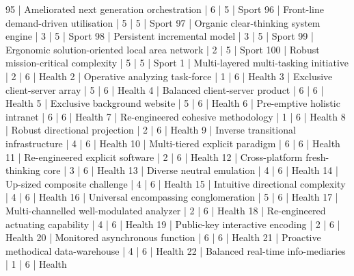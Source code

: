 \begin{enumerate}
\begin{pseudo*}
      95 | Ameliorated next generation orchestration        |        6 |      5 | Sport
      96 | Front-line demand-driven utilisation             |        5 |      5 | Sport
      97 | Organic clear-thinking system engine             |        3 |      5 | Sport
      98 | Persistent incremental model                     |        3 |      5 | Sport
      99 | Ergonomic solution-oriented local area network   |        2 |      5 | Sport
     100 | Robust mission-critical complexity               |        5 |      5 | Sport
       1 | Multi-layered multi-tasking initiative           |        2 |      6 | Health        
       2 | Operative analyzing task-force                   |        1 |      6 | Health        
       3 | Exclusive client-server array                    |        5 |      6 | Health        
       4 | Balanced client-server product                   |        6 |      6 | Health        
       5 | Exclusive background website                     |        5 |      6 | Health        
       6 | Pre-emptive holistic intranet                    |        6 |      6 | Health        
       7 | Re-engineered cohesive methodology               |        1 |      6 | Health        
       8 | Robust directional projection                    |        2 |      6 | Health        
       9 | Inverse transitional infrastructure              |        4 |      6 | Health        
      10 | Multi-tiered explicit paradigm                   |        6 |      6 | Health        
      11 | Re-engineered explicit software                  |        2 |      6 | Health        
      12 | Cross-platform fresh-thinking core               |        3 |      6 | Health        
      13 | Diverse neutral emulation                        |        4 |      6 | Health        
      14 | Up-sized composite challenge                     |        4 |      6 | Health        
      15 | Intuitive directional complexity                 |        4 |      6 | Health        
      16 | Universal encompassing conglomeration            |        5 |      6 | Health        
      17 | Multi-channelled well-modulated analyzer         |        2 |      6 | Health        
      18 | Re-engineered actuating capability               |        4 |      6 | Health        
      19 | Public-key interactive encoding                  |        2 |      6 | Health        
      20 | Monitored asynchronous function                  |        6 |      6 | Health        
      21 | Proactive methodical data-warehouse              |        4 |      6 | Health        
      22 | Balanced real-time info-mediaries                |        1 |      6 | Health        

\end{pseudo*}
\end{enumerate}
